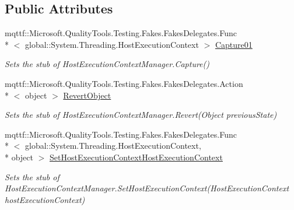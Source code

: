 \subsection*{Public Attributes}
\begin{DoxyCompactItemize}
\item 
mqttf\-::\-Microsoft.\-Quality\-Tools.\-Testing.\-Fakes.\-Fakes\-Delegates.\-Func\\*
$<$ global\-::\-System.\-Threading.\-Host\-Execution\-Context $>$ \hyperlink{class_system_1_1_threading_1_1_fakes_1_1_stub_host_execution_context_manager_a85038b35a1b8cc8d6dd85878effcacff}{Capture01}
\begin{DoxyCompactList}\small\item\em Sets the stub of Host\-Execution\-Context\-Manager.\-Capture()\end{DoxyCompactList}\item 
mqttf\-::\-Microsoft.\-Quality\-Tools.\-Testing.\-Fakes.\-Fakes\-Delegates.\-Action\\*
$<$ object $>$ \hyperlink{class_system_1_1_threading_1_1_fakes_1_1_stub_host_execution_context_manager_a97b8a82065f7c160cc6d428b16c99a64}{Revert\-Object}
\begin{DoxyCompactList}\small\item\em Sets the stub of Host\-Execution\-Context\-Manager.\-Revert(\-Object previous\-State)\end{DoxyCompactList}\item 
mqttf\-::\-Microsoft.\-Quality\-Tools.\-Testing.\-Fakes.\-Fakes\-Delegates.\-Func\\*
$<$ global\-::\-System.\-Threading.\-Host\-Execution\-Context, \\*
object $>$ \hyperlink{class_system_1_1_threading_1_1_fakes_1_1_stub_host_execution_context_manager_a8b01dd91845f100685fef0c2be04c9f7}{Set\-Host\-Execution\-Context\-Host\-Execution\-Context}
\begin{DoxyCompactList}\small\item\em Sets the stub of Host\-Execution\-Context\-Manager.\-Set\-Host\-Execution\-Context(\-Host\-Execution\-Context host\-Execution\-Context)\end{DoxyCompactList}\end{DoxyCompactItemize}
